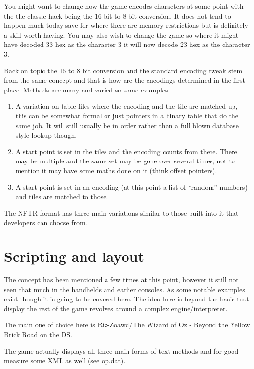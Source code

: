 \documentclass[
]{book}
\providecommand{\tightlist}{%
  \setlength{\itemsep}{0pt}\setlength{\parskip}{0pt}}
\begin{document}
You might want to change how the game encodes characters at some point with the the classic hack being the 16 bit to 8 bit conversion. It does not tend to happen much today save for where there are memory restrictions but is definitely a skill worth having. You may also wish to change the game so where it might have decoded 33 hex as the character 3 it will now decode 23 hex as the character 3.

Back on topic the 16 to 8 bit conversion and the standard encoding tweak stem from the same concept and that is how are the encodings determined in the first place. Methods are many and varied so some examples

\begin{enumerate}
\def\labelenumi{\arabic{enumi}.}
\tightlist
\item
  A variation on table files where the encoding and the tile are matched up, this can be somewhat formal or just pointers in a binary table that do the same job. It will still usually be in order rather than a full blown database style lookup though.
\item
  A start point is set in the tiles and the encoding counts from there. There may be multiple and the same set may be gone over several times, not to mention it may have some maths done on it (think offset pointers).
\item
  A start point is set in an encoding (at this point a list of ``random'' numbers) and tiles are matched to those.
\end{enumerate}

The NFTR format has three main variations similar to those built into it that developers can choose from.

\hypertarget{scripting-and-layout}{%
\section{Scripting and layout}\label{scripting-and-layout}}

The concept has been mentioned a few times at this point, however it still not seen that much in the handhelds and earlier consoles. As some notable examples exist though it is going to be covered here. The idea here is beyond the basic text display the rest of the game revolves around a complex engine/interpreter.

The main one of choice here is Riz-Zoawd/The Wizard of Oz - Beyond the Yellow Brick Road on the DS.

The game actually displays all three main forms of text methods and for good measure some XML as well (see op.dat).
\end{document}
